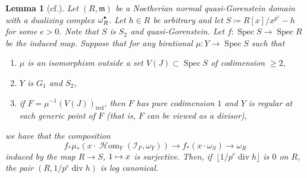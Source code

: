 \documentclass[11pt]{article}
\newcommand{\cf}{cf.\xspace}
\newcommand\mto{\mathchoice{\longmapsto}{\mapsto}{\mapsto}{\mapsto}}
\newcommand{\sbullet}{{\scriptscriptstyle\bullet}}
\newcommand{\csbullet}{{\raisebox{1pt}{$\sbullet$}}}
\theoremstyle{plain}
\newtheorem{lemma}[theorem]{Lemma}
\theoremstyle{definition}
\numberwithin{equation}{theorem}
\newcommand{\fram}{\mathfrak{m}}
\DeclareMathOperator{\Div}{{div}}
\DeclareMathOperator{\sHom}{{\sH}om}
\DeclareMathOperator{\red}{red}
\DeclareMathOperator{\Spec}{{Spec}}
\newcommand{\sH}{\mathcal{H}}
\newcommand{\sI}{\mathcal{I}}
\newcommand{\unpe}{{1/{p^e}}}
\newcommand{\pe}{{p^e}}
\newcommand{\inv}{^{-1}}
\begin{document}
\begin{lemma}[{\cf \cite[Prop.\,5.15]{BMPSTWWPerfectoidPure}}]\label{lemma lcness can be tested from S}
Let $(R,\fram)$ be a Noetherian normal quasi-Gorenstein domain with a dualizing complex $\omega_R^\csbullet$. Let $h\in R$ be arbitrary and let $S\coloneqq R[x]/x^\pe-h$ for some $e>0$. Note that $S$ is $S_2$ and quasi-Gorenstein.
Let $f\colon \Spec S\to \Spec R$ be the induced map. Suppose that for any birational $\mu\colon Y\to \Spec S$ such that
\begin{enumerate}
\item $\mu$ is an isomorphism outside a set $V(J)\subset \Spec S$ of codimension $\geq 2$,
\item $Y$ is $G_1$ and $S_2$,
\item if $F=\mu\inv(V(J))_{\red}$, then $F$ has pure codimension $1$ and $Y$ is regular at each generic point of $F$ (that is, $F$ can be viewed as a divisor),
\end{enumerate}
we have that the composition
\begin{equation}\label{map omegay(F) to omega(R) via x}
f_*\mu_*( x\cdot \sHom_Y(\sI_F,\omega_Y)) \to f_* (x\cdot \omega_S) \to \omega_R
\end{equation}
induced by the map $R\to S$, $1\mto x$ is surjective.
Then, if~$\lfloor \unpe\Div h \rfloor$ is $0$ on $R$, the pair $(R,\unpe \Div h)$ is log canonical.
\end{lemma}
\end{document}

